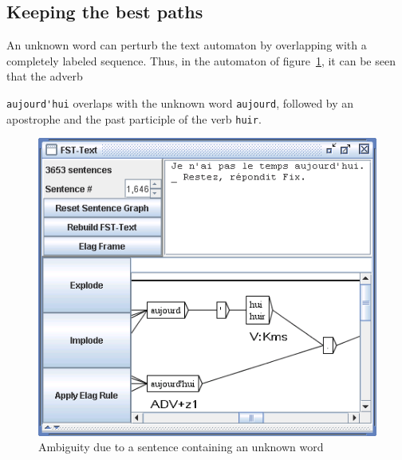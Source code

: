 \subsection{Keeping the best paths}
\label{section-keeping-best-paths}
An unknown word can perturb the text automaton by overlapping with a completely
labeled sequence. Thus, in the automaton of
figure~\ref{fig-unknown-word-ambiguity}, it can be seen that the
adverb

\noindent \verb+aujourd'hui+ overlaps with the unknown word \verb+aujourd+,
followed by an apostrophe and the past participle of the verb \verb+huir+.


\begin{figure}[!ht]
\begin{center}
\includegraphics[width=11.6cm]{resources/img/fig7-8.png}
\caption{Ambiguity due to a sentence containing an unknown
word\label{fig-unknown-word-ambiguity}}
\end{center}
\end{figure}

